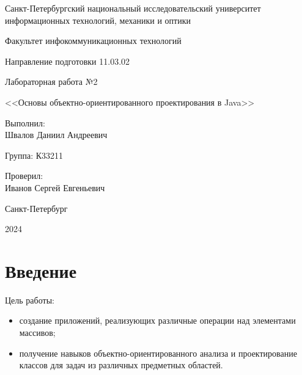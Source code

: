\documentclass[a4paper, 14pt]{extarticle}
\begin{document}
\begin{titlepage}
  \vspace{0pt plus2fill}
  \noindent

  \vspace{0pt plus6fill}
  \begin{center}
    Санкт-Петербургский национальный исследовательский университет
    информационных технологий, механики и оптики

    \vspace{0pt plus3fill}

    Факультет инфокоммуникационных технологий

    Направление подготовки 11.03.02

    \vspace{0pt plus2fill}

    Лабораторная работа №2

    <<Основы объектно-ориентированного проектирования в Java>>

  \end{center}

  \vspace{0pt plus6fill}
  \begin{flushright}
    Выполнил: \\
    Швалов Даниил Андреевич

    Группа: К33211

    Проверил: \\
    Иванов Сергей Евгеньевич
  \end{flushright}

  \vspace{0pt plus5fill}
  \begin{center}
    Санкт-Петербург

    2024
  \end{center}
\end{titlepage}

\setcounter{page}{2}

\section*{Введение}

Цель работы:
\begin{itemize}
  \item создание приложений, реализующих различные операции над элементами
  массивов;
  \item получение навыков объектно-ориентированного анализа и проектирование
  классов для задач из различных предметных областей.
\end{itemize}
\end{document}
